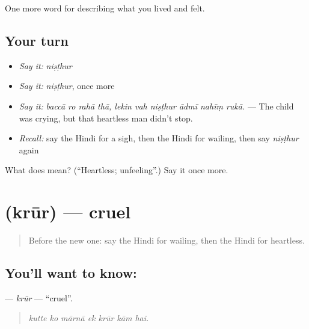 \begin{grammarlens}[title={What you've built}]
One more word for describing what you lived and felt.
\end{grammarlens}

\subsection*{Your turn}
\begin{itemize}
\raggedright
  \item \emph{Say it:} \emph{niṣṭhur}
  \item \emph{Say it:} \emph{niṣṭhur}, once more
  \item \emph{Say it:} \emph{baccā ro rahā thā, lekin vah niṣṭhur ādmī nahīṃ rukā.} — The child was crying, but that heartless man didn't stop.
  \item \emph{Recall:} say the Hindi for a sigh, then the Hindi for wailing, then say \emph{niṣṭhur} again
\end{itemize}

\begin{tcolorbox}[breakable,colback=teal!4,colframe=teal!35!black,title={Before you move on}]
What does  mean? (\textquotedblleft{}Heartless; unfeeling\textquotedblright{}.) Say it once more.
\end{tcolorbox}
\section[\texorpdfstring{\hi{क्रूर} (krūr)}{क्रूर (krūr)}]{ (krūr) — cruel}

\label{lesson:HI-C466-krur}



\begin{quote}
Before the new one: say the Hindi for wailing, then the Hindi for heartless.
\end{quote}

\subsection*{You'll want to know: }
\textbf{} — \emph{krūr} — \textquotedblleft{}cruel\textquotedblright{}.

\begin{quote}
      
\end{quote}

\begin{quote}
\emph{kutte ko mārnā ek krūr kām hai.}
\end{quote}

